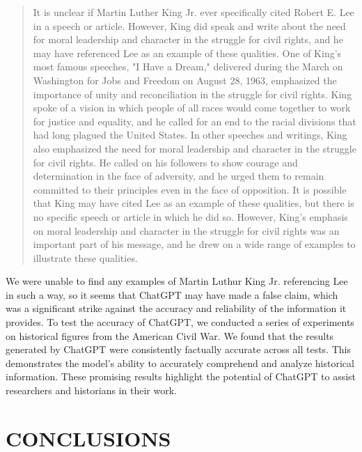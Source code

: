 \documentclass[letterpaper, 10pt, conference]{ieeeconf}
\begin{document}
    \begin{quote}
        
    It is unclear if Martin Luther King Jr. ever specifically cited Robert E. Lee in a speech or article. However, King did
    speak and write about the need for moral leadership and character in the struggle for civil rights, and he may have
    referenced Lee as an example of these qualities. One of King's most famous speeches, "I Have a Dream," delivered during
    the March on Washington for Jobs and Freedom on August 28, 1963, emphasized the importance of unity and
    reconciliation in the struggle for civil rights. King spoke of a vision in which people of all races would come together to
    work for justice and equality, and he called for an end to the racial divisions that had long plagued the United States. In
    other speeches and writings, King also emphasized the need for moral leadership and character in the struggle for civil
    rights. He called on his followers to show courage and determination in the face of adversity, and he urged them to
    remain committed to their principles even in the face of opposition. It is possible that King may have cited Lee as an
    example of these qualities, but there is no specific speech or article in which he did so. However, King's emphasis on
    moral leadership and character in the struggle for civil rights was an important part of his message, and he drew on a
    wide range of examples to illustrate these qualities.
    \end{quote}
    We were unable to find any examples of Martin Luthur King Jr. referencing Lee in such a way, so it seems that ChatGPT may have
    made a false claim, which was a significant strike against the accuracy and reliability of the information it provides.
    To test the accuracy of ChatGPT, we conducted a series of experiments on historical figures from the American Civil War. We
    found that the results generated by ChatGPT were consistently factually accurate across all tests. This demonstrates the model's
    ability to accurately comprehend and analyze historical information. These promising results highlight the potential of ChatGPT to
    assist researchers and historians in their work.
       
    
    
    
    \section{CONCLUSIONS}
    
\end{document}
